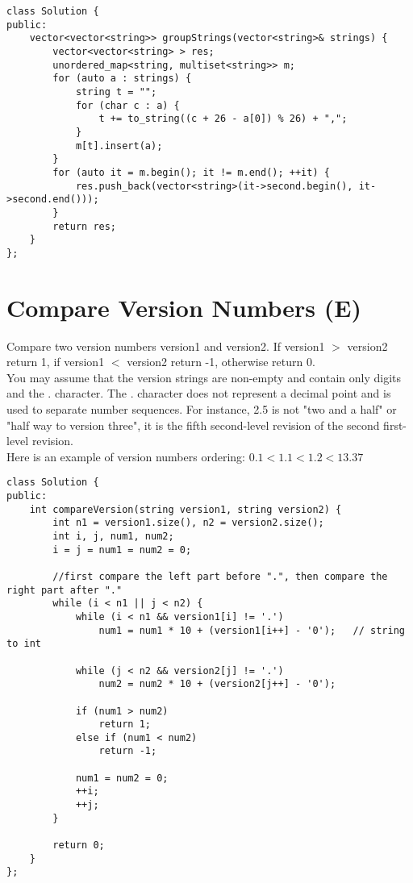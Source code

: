 \begin{lstlisting}
class Solution {
public:
    vector<vector<string>> groupStrings(vector<string>& strings) {
        vector<vector<string> > res;
        unordered_map<string, multiset<string>> m;
        for (auto a : strings) {
            string t = "";
            for (char c : a) {
                t += to_string((c + 26 - a[0]) % 26) + ",";
            }
            m[t].insert(a);
        }
        for (auto it = m.begin(); it != m.end(); ++it) {
            res.push_back(vector<string>(it->second.begin(), it->second.end()));
        }
        return res;
    }
};
\end{lstlisting}


\section{Compare Version Numbers (E)}
Compare two version numbers version1 and version2. If version1 $>$ version2 return 1, if version1 $<$ version2 return -1, otherwise return 0.\\

You may assume that the version strings are non-empty and contain only digits and the . character.
The . character does not represent a decimal point and is used to separate number sequences.
For instance, 2.5 is not "two and a half" or "half way to version three", it is the fifth second-level revision of the second first-level revision.\\

Here is an example of version numbers ordering: $0.1 < 1.1 < 1.2 < 13.37$\\

\begin{lstlisting}
class Solution {
public:
    int compareVersion(string version1, string version2) {
        int n1 = version1.size(), n2 = version2.size();
        int i, j, num1, num2;
        i = j = num1 = num2 = 0;
        
        //first compare the left part before ".", then compare the right part after "."
        while (i < n1 || j < n2) {
            while (i < n1 && version1[i] != '.')
                num1 = num1 * 10 + (version1[i++] - '0');   // string to int

            while (j < n2 && version2[j] != '.')
                num2 = num2 * 10 + (version2[j++] - '0');
            
            if (num1 > num2)
                return 1;
            else if (num1 < num2)
                return -1;
            
            num1 = num2 = 0;
            ++i;
            ++j;
        }
        
        return 0;
    }
};
\end{lstlisting}


